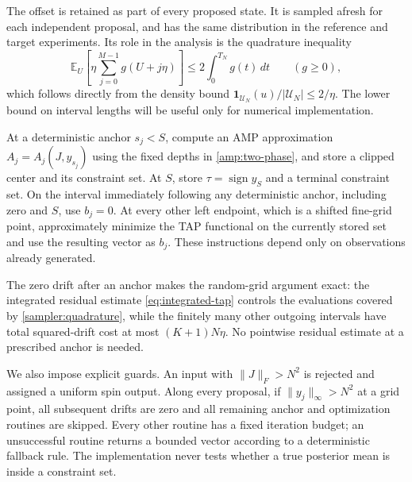 \documentclass[11pt,reqno]{amsart}
\newcommand{\sign}{\operatorname{sign}}
\begin{document}
The offset is retained as part of every proposed state. It is sampled
afresh for each independent proposal, and has the same distribution in
the reference and target experiments. Its role in the analysis is the
quadrature inequality
\begin{equation}\label{sampler:quadrature}
 \mathbb E_U\left[\eta\sum_{j=0}^{M-1}g(U+j\eta)\right]
 \le2\int_0^{T_N}g(t)\,dt
 \qquad(g\ge0),
\end{equation}
which follows directly from the density bound
$\mathbf1_{\mathcal U_N}(u)/|\mathcal U_N|\le2/\eta$.
The lower bound on interval lengths will be useful only for numerical
implementation.

At a deterministic anchor $s_j<S$, compute an AMP approximation
$A_j=A_j(J,y_{s_j})$ using the fixed depths in
\eqref{amp:two-phase}, and store a clipped center and its constraint
set. At $S$, store $\tau=\sign y_S$ and a terminal constraint set.
On the interval immediately following any deterministic anchor,
including zero and $S$, use $b_j=0$. At every other left endpoint,
which is a shifted fine-grid point, approximately minimize the TAP
functional on the currently stored set and use the resulting vector
as $b_j$. These instructions depend only on observations already
generated.

The zero drift after an anchor makes the random-grid argument exact:
the integrated residual estimate \eqref{eq:integrated-tap} controls
the evaluations covered by \eqref{sampler:quadrature}, while the
finitely many other outgoing intervals have total squared-drift cost
at most $(K+1)N\eta$. No pointwise residual estimate at a prescribed
anchor is needed.

We also impose explicit guards. An input with $\|J\|_F>N^2$ is
rejected and assigned a uniform spin output. Along every proposal,
if $\|y_j\|_\infty>N^2$ at a grid point, all subsequent drifts are
zero and all remaining anchor and optimization routines are skipped.
Every other routine has a fixed iteration budget; an unsuccessful
routine returns a bounded vector according to a deterministic fallback
rule. The implementation never tests whether a true posterior mean is
inside a constraint set.
\end{document}
